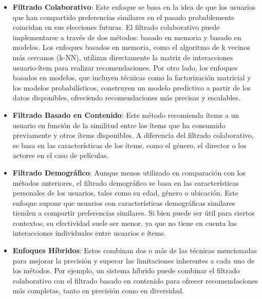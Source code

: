 \documentclass[twocolumn, fontsize=10pt]{article}
\begin{document}
\begin{itemize}
    \item \textbf{Filtrado Colaborativo}: 
    Este enfoque se basa en la idea de que los 
    usuarios que han compartido preferencias similares 
    en el pasado probablemente coincidan en sus 
    elecciones futuras. El filtrado colaborativo puede 
    implementarse a través de dos métodos: 
    basado en memoria y basado en modelos. 
    Los enfoques basados en memoria, como el algoritmo 
    de k vecinos más cercanos (k-NN), utilizan 
    directamente la matriz de interacciones 
    usuario-ítem para realizar recomendaciones. 
    Por otro lado, los enfoques basados en modelos, 
    que incluyen técnicas como la factorización 
    matricial y los modelos probabilísticos, 
    construyen un modelo predictivo a partir de los 
    datos disponibles, ofreciendo recomendaciones más 
    precisas y escalables. \cite{estado_arte_sistemas_recomendacion}
    \item \textbf{Filtrado Basado en Contenido}: 
    Este método recomienda ítems a un usuario en 
    función de la similitud entre los ítems que ha 
    consumido previamente y otros ítems disponibles. 
    A diferencia del filtrado colaborativo, se basa en 
    las características de los ítems, como el género, 
    el director o los actores en el caso de películas. \cite{estado_arte_sistemas_recomendacion}
    \item \textbf{Filtrado Demográfico}: 
    Aunque menos utilizado en comparación con los 
    métodos anteriores, el filtrado demográfico se 
    basa en las características personales de los 
    usuarios, tales como su edad, género o ubicación. 
    Este enfoque supone que usuarios con 
    características demográficas similares tienden a 
    compartir preferencias similares. 
    Si bien puede ser útil para ciertos contextos, 
    su efectividad suele ser menor, ya que no tiene 
    en cuenta las interacciones individuales entre 
    usuarios e ítems. \cite{estado_arte_sistemas_recomendacion}
    \item \textbf{Enfoques Híbridos}:
    Estos combinan dos o más de las técnicas 
    mencionadas para mejorar la precisión y superar 
    las limitaciones inherentes a cada uno de los 
    métodos. Por ejemplo, un sistema híbrido puede 
    combinar el filtrado colaborativo con el filtrado 
    basado en contenido para ofrecer recomendaciones 
    más completas, tanto en precisión como en 
    diversidad. \cite{estado_arte_sistemas_recomendacion}
\end{itemize}
\end{document}
